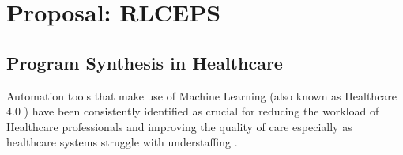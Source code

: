\chapter{Proposal: RLCEPS}
\label{ch:proposal}

\section{Program Synthesis in Healthcare}
\label{sec:ps-health}

Automation tools that make use of Machine Learning (also known as Healthcare 4.0 \cite{tortorellaHealthcareTrendsChallenges2020}) have been consistently identified as crucial for reducing the workload of Healthcare professionals and improving the quality of care \cite{agrawalMachineLearningHealthcare2020, deviDesignImplementationAdvanced2022, g.kumarSurveyMachineLearning2016, ganguliMachineLearningPursuit2020, maityMachineLearningImproved2017, mitraMachineLearningHealthcare2021, pianykhImprovingHealthcareOperations2020, xhaferraRoleMachineLearning2022} especially as healthcare systems struggle with understaffing \cite{ashleyy.metcalfHospitalUnitUnderstaffing2016,SurveyShowsHidden1993,UnderstaffingSignificantIssue2012,campbellUniversalHealthCoverage2013, hudsonUnderstaffing2015, mercerMessageEditorinChief2008, r.stanleyUnderstaffedOverwhelmed2010, munnUnderstaffingWardsCompromising2017, thelancetHealthcareSystemStaffing2018}.

